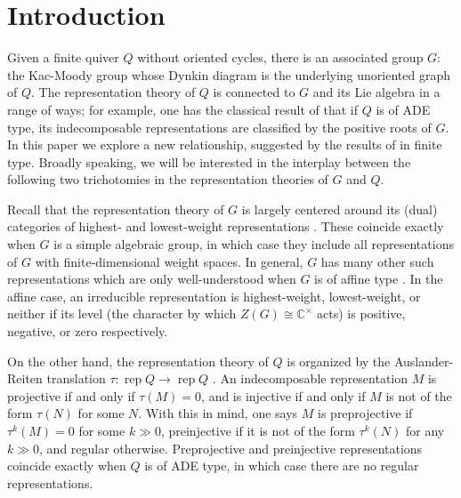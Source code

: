 \documentclass[12pt]{amsart}
\newcommand{\CC}{\mathbb{C}}
\newcommand{\rep}{\operatorname{rep}}
\theoremstyle{remark}
\numberwithin{equation}{section}
\numberwithin{figure}{section}
\begin{document}
\section{Introduction}

Given a finite quiver $Q$ without oriented cycles, there is an associated group $G$: the Kac-Moody group whose Dynkin diagram is the underlying unoriented graph of $Q$. The representation theory of $Q$ is connected to $G$ and its Lie algebra in a range of ways; for example, one has the classical result of \cite{BGP73} that if $Q$ is of ADE type, its indecomposable representations are classified by the positive roots of $G$. In this paper we explore a new relationship, suggested by the results of \cite{YZ08} in finite type. Broadly speaking, we will be interested in the interplay between the following two trichotomies in the representation theories of $G$ and $Q$.


Recall that the representation theory of $G$ is largely centered around its (dual) categories of highest- and lowest-weight representations \cite{KP83,Kum02}. These coincide exactly when $G$ is a simple algebraic group, in which case they include all representations of $G$ with finite-dimensional weight spaces. In general, $G$ has many other such representations which are only well-understood when $G$ is of affine type \cite{Cha86}. In the affine case, an irreducible representation is highest-weight, lowest-weight, or neither if its level (the character by which $Z(G) \cong \CC^\times$ acts) is positive, negative, or zero respectively.

On the other hand, the representation theory of $Q$ is organized by the Auslander-Reiten translation $\tau: \rep Q \to \rep Q$ \cite{ASS06}. An indecomposable representation $M$ is projective if and only if $\tau(M) = 0$, and is injective if and only if $M$ is not of the form $\tau(N)$ for some $N$. With this in mind, one says $M$ is preprojective if $\tau^k(M) = 0$ for some $k\gg 0$, preinjective if it is not of the form $\tau^k(N)$ for any $k\gg 0$, and regular otherwise. Preprojective and preinjective representations coincide exactly when $Q$ is of ADE type, in which case there are no regular representations.
\end{document}
